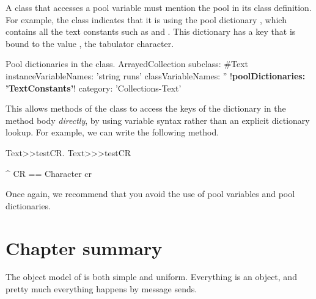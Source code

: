 \documentclass[a4paper,10pt,twoside]{book}
\begin{document}
A class that accesses a pool variable must mention the pool in its class definition.
For example, the class  indicates that it is using the pool dictionary , which contains all the text constants such as  and .
This dictionary has a key  that is bound to the value , \ie the tabulator character.

\begin{classdef}[textpooldict]{Pool dictionaries in the  class.}
ArrayedCollection subclass: #Text
        instanceVariableNames: 'string runs'
        classVariableNames: ''
        !\textbf{poolDictionaries: 'TextConstants'}!
        category: 'Collections-Text'
\end{classdef}

This allows methods of the class  to access the keys of the dictionary in the method body \emph{directly}, \ie by using variable syntax rather than an explicit dictionary lookup.
For example, we can write the following method.

\begin{method}[texttestcr]{Text>>testCR.}
Text>>>testCR

      ^ CR == Character cr
\end{method}

Once again, we recommend that you avoid the use of pool variables and pool dictionaries.

\section{Chapter summary}

The object model of \squeak is both simple and uniform.
Everything is an object, and pretty much everything happens by message sends.
\end{document}
